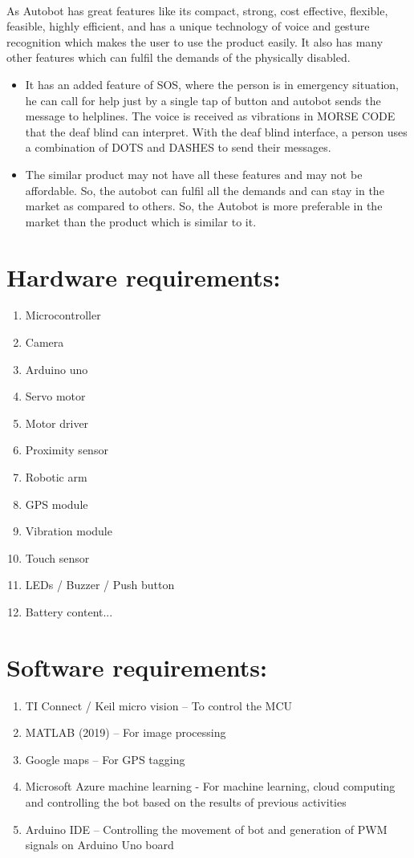 \documentclass[12pt,a4paper]{article}
\begin{document}
	\paragraph{}
	As Autobot has great features like its compact, strong, cost effective, flexible, feasible, highly efficient, and has a unique technology of voice and gesture recognition which makes the user to use the product easily. It also has many other features which can fulfil the demands of the physically disabled.
	\begin{itemize}
		
		\item It has an added feature of SOS, where the person is in emergency situation, he can call for help just by a single tap of button and autobot sends the message to helplines. The voice is received as vibrations in MORSE CODE that the deaf blind can interpret. With the deaf blind interface, a person uses a combination of DOTS and DASHES to send their messages.
		\item The similar product may not have all these features and may not be affordable. So, the autobot can fulfil all the demands and can stay in the market as compared to others. So, the Autobot is more preferable in the market than the product which is similar to it.
	\end{itemize}
	\section{Hardware requirements:}
	\begin{enumerate}
		\item Microcontroller
		\item Camera
		\item Arduino uno
		\item Servo motor
		\item Motor driver
		\item Proximity sensor
		\item Robotic arm
		\item GPS module
		\item Vibration module
		\item Touch sensor
		\item LEDs / Buzzer / Push button
		\item Battery		content...
	\end{enumerate}
	\section{Software requirements:}
	\begin{enumerate}
		\item TI Connect / Keil micro vision – To control the MCU
		\item MATLAB (2019) – For image processing
		\item Google maps – For GPS tagging
		\item Microsoft Azure machine learning - For machine learning, cloud computing and controlling the bot based on the results of previous activities
		\item Arduino IDE – Controlling the movement of bot and generation of PWM signals on Arduino Uno board
	\end{enumerate}
\end{document}
